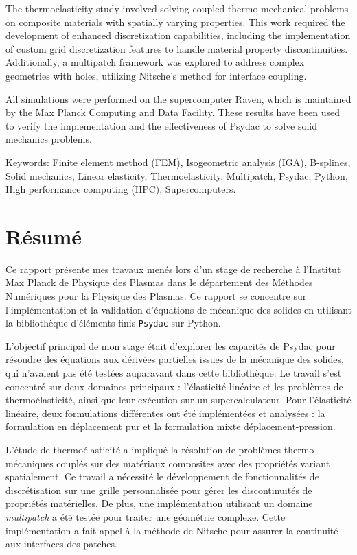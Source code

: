 \documentclass[a4paper,12pt,twoside]{report}
\begin{document}
The thermoelasticity study involved solving coupled thermo-mechanical problems on composite materials with spatially varying properties. This work required the development of enhanced discretization capabilities, including the implementation of custom grid discretization features to handle material property discontinuities. Additionally, a multipatch framework was explored to address complex geometries with holes, utilizing Nitsche's method for interface coupling.

All simulations were performed on the supercomputer Raven, which is maintained by the Max Planck Computing and Data Facility. These results have been used to verify the implementation and the effectiveness of Psydac to solve solid mechanics problems.

\vspace{0.4cm}

\underline{Keywords}: Finite element method (FEM), Isogeometric analysis (IGA), B-splines, Solid mechanics, Linear elasticity, Thermoelasticity, Multipatch, Psydac, Python, High performance computing (HPC), Supercomputers.

\section*{Résumé}

Ce rapport présente mes travaux menés lors d'un stage de recherche à l'Institut Max Planck de Physique des Plasmas dans le département des Méthodes Numériques pour la Physique des Plasmas. Ce rapport se concentre sur l'implémentation et la validation d'équations de mécanique des solides en utilisant la bibliothèque d'éléments finis \texttt{Psydac} sur Python.

L'objectif principal de mon stage était d'explorer les capacités de Psydac pour résoudre des équations aux dérivées partielles issues de la mécanique des solides, qui n'avaient pas été testées auparavant dans cette bibliothèque. Le travail s'est concentré sur deux domaines principaux : l'élasticité linéaire et les problèmes de thermoélasticité, ainsi que leur exécution sur un supercalculateur. Pour l'élasticité linéaire, deux formulations différentes ont été implémentées et analysées : la formulation en déplacement pur et la formulation mixte déplacement-pression.

L'étude de thermoélasticité a impliqué la résolution de problèmes thermo-mécaniques couplés sur des matériaux composites avec des propriétés variant spatialement. Ce travail a nécessité le développement de fonctionnalités de discrétisation sur une grille personnalisée pour gérer les discontinuités de propriétés matérielles. De plus, une implémentation utilisant un domaine \textit{multipatch} a été testée pour traiter une géométrie complexe. Cette implémentation a fait appel à la méthode de Nitsche pour assurer la continuité aux interfaces des patches.
\end{document}
